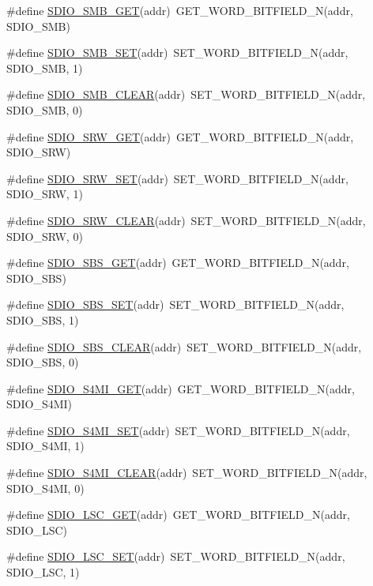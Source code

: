 \begin{DoxyCompactItemize}
\item 
\#define \hyperlink{a00570_a4f8a93b15ac201e674d110ec716b3090}{SDIO\_\-SMB\_\-GET}(addr)~GET\_\-WORD\_\-BITFIELD\_\-N(addr, SDIO\_\-SMB)
\item 
\#define \hyperlink{a00570_a927903bf4f8e8dedaa261ba4cb218841}{SDIO\_\-SMB\_\-SET}(addr)~SET\_\-WORD\_\-BITFIELD\_\-N(addr, SDIO\_\-SMB, 1)
\item 
\#define \hyperlink{a00570_af699b2d05defdcb318f79497001656b5}{SDIO\_\-SMB\_\-CLEAR}(addr)~SET\_\-WORD\_\-BITFIELD\_\-N(addr, SDIO\_\-SMB, 0)
\item 
\#define \hyperlink{a00570_af8fc9dd094e094a7000036c3761b12e5}{SDIO\_\-SRW\_\-GET}(addr)~GET\_\-WORD\_\-BITFIELD\_\-N(addr, SDIO\_\-SRW)
\item 
\#define \hyperlink{a00570_a70cc4f32dfdd80fbf7febbae1f7cff80}{SDIO\_\-SRW\_\-SET}(addr)~SET\_\-WORD\_\-BITFIELD\_\-N(addr, SDIO\_\-SRW, 1)
\item 
\#define \hyperlink{a00570_a209ae6d34b6752a059abadfbb9c2cf46}{SDIO\_\-SRW\_\-CLEAR}(addr)~SET\_\-WORD\_\-BITFIELD\_\-N(addr, SDIO\_\-SRW, 0)
\item 
\#define \hyperlink{a00570_a8c72e541837b551c067a42989d61d56f}{SDIO\_\-SBS\_\-GET}(addr)~GET\_\-WORD\_\-BITFIELD\_\-N(addr, SDIO\_\-SBS)
\item 
\#define \hyperlink{a00570_a9d2117ef27f43a12b27e1e3cc9b3f006}{SDIO\_\-SBS\_\-SET}(addr)~SET\_\-WORD\_\-BITFIELD\_\-N(addr, SDIO\_\-SBS, 1)
\item 
\#define \hyperlink{a00570_a7d995ae9fd12cdb09859606bab260710}{SDIO\_\-SBS\_\-CLEAR}(addr)~SET\_\-WORD\_\-BITFIELD\_\-N(addr, SDIO\_\-SBS, 0)
\item 
\#define \hyperlink{a00570_a3a61744ec17969103bdaf667f4a81db3}{SDIO\_\-S4MI\_\-GET}(addr)~GET\_\-WORD\_\-BITFIELD\_\-N(addr, SDIO\_\-S4MI)
\item 
\#define \hyperlink{a00570_a3db55190ad0832494c0f3070fc2114e7}{SDIO\_\-S4MI\_\-SET}(addr)~SET\_\-WORD\_\-BITFIELD\_\-N(addr, SDIO\_\-S4MI, 1)
\item 
\#define \hyperlink{a00570_ac097ba6e3a0978c18dce9ee233750fb1}{SDIO\_\-S4MI\_\-CLEAR}(addr)~SET\_\-WORD\_\-BITFIELD\_\-N(addr, SDIO\_\-S4MI, 0)
\item 
\#define \hyperlink{a00570_a00be070b5c2fe530e501ecee232fde14}{SDIO\_\-LSC\_\-GET}(addr)~GET\_\-WORD\_\-BITFIELD\_\-N(addr, SDIO\_\-LSC)
\item 
\#define \hyperlink{a00570_a7286800cc70914272c0f6d89d022f8ef}{SDIO\_\-LSC\_\-SET}(addr)~SET\_\-WORD\_\-BITFIELD\_\-N(addr, SDIO\_\-LSC, 1)

\end{DoxyCompactItemize}
